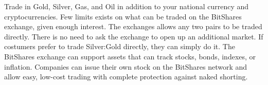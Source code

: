 Trade in Gold, Silver, Gas, and Oil in addition to your national currency and
cryptocurrencies. Few limits exists on what can be traded on the BitShares
exchange, given enough interest. The exchanges allows any two pairs to be
traded directly. There is no need to ask the exchange to open up an additional
market. If costumers prefer to trade Silver:Gold directly, they can simply do
it. The BitShares exchange can support assets that can track stocks, bonds,
indexes, or inflation. Companies can issue their own stock on the BitShares
network and allow easy, low-cost trading with complete protection against naked
shorting.
